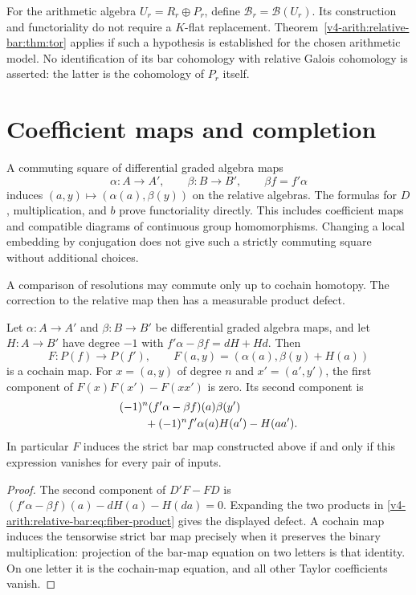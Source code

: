 For the arithmetic algebra $U_r=R_r\oplus P_r$, define
$\mathcal{B}_r=\mathcal{B}(U_r)$. Its construction and functoriality do not require
a $K$-flat replacement. Theorem~\ref{v4-arith:relative-bar:thm:tor} applies if such a
hypothesis is established for the chosen arithmetic model. No
identification of its bar cohomology with relative Galois cohomology
is asserted: the latter is the cohomology of $P_r$ itself.

\section{Coefficient maps and completion}

A commuting square of differential graded algebra maps
\[
 \alpha:A\to A',\qquad\beta:B\to B',\qquad\beta f=f'\alpha
\]
induces $(a,y)\mapsto(\alpha(a),\beta(y))$ on the relative algebras.
The formulas for $D$, multiplication, and $b$ prove functoriality
directly. This includes coefficient maps and compatible diagrams
of continuous group homomorphisms. Changing a local embedding by
conjugation does not give such a strictly commuting square without
additional choices.

A comparison of resolutions may commute only up to cochain homotopy.
The correction to the relative map then has a measurable product defect.

\begin{proposition}\label{v4-arith:relative-bar:prop:homotopy}
Let $\alpha:A\to A'$ and $\beta:B\to B'$ be differential graded
algebra maps, and let $H:A\to B'$ have degree $-1$ with
$f'\alpha-\beta f=dH+Hd$. Then
\[
 F:P(f)\to P(f'),\qquad F(a,y)=(\alpha(a),\beta(y)+H(a))
\]
is a cochain map. For $x=(a,y)$ of degree $n$ and $x'=(a',y')$,
the first component of $F(x)F(x')-F(xx')$ is zero. Its second
component is
\begin{align*}
 &(-1)^n(f'\alpha-\beta f)(a)\beta(y')\\
 &\hspace{8mm}+(-1)^nf'\alpha(a)H(a')-H(aa').
\end{align*}
In particular $F$ induces the strict bar map constructed above if
and only if this expression vanishes for every pair of inputs.
\end{proposition}
\begin{proof}
The second component of $D'F-FD$ is
$(f'\alpha-\beta f)(a)-dH(a)-H(da)=0$.
Expanding the two products in \eqref{v4-arith:relative-bar:eq:fiber-product} gives the
displayed defect. A cochain map induces the tensorwise strict bar
map precisely when it preserves the binary multiplication: projection
of the bar-map equation on two letters is that identity. On one
letter it is the cochain-map equation, and all other Taylor
coefficients vanish.
\end{proof}

